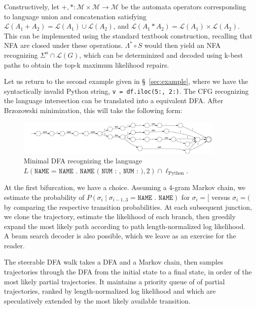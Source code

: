 \documentclass[sigplan,review,acmsmall,nonacm,anonymous]{acmart}\settopmatter{printfolios=false,printccs=false,printacmref=false}
\begin{document}
  Constructively, let $+, *: \mathcal{M}\times \mathcal{M} \rightarrow \mathcal{M}$ be the automata operators corresponding to language union and concatenation satisfying $\mathcal{L}(A_1 + A_2) = \mathcal{L}(A_1)\cup\mathcal{L}(A_2)$, and $\mathcal{L}(A_1 * A_2) = \mathcal{L}(A_1)\times\mathcal{L}(A_2)$. This can be implemented using the standard textbook construction, recalling that NFA are closed under these operations. $\Lambda^* \circ S$ would then yield an NFA recognizing $\Sigma^n\cap\mathcal{L}(G)$, which can be determinized and decoded using k-best paths to obtain the top-k maximum likelihood repairs.

Let us return to the second example given in \S~\ref{sec:example}, where we have the syntactically invalid Python string, \texttt{v = df.iloc(5:, 2:)}. The CFG recognizing the language intersection can be translated into a equivalent DFA. After Brzozowski minimization, this will take the following form:


\begin{figure}[H]
  \centering
  \includegraphics[width=0.9\textwidth]{exampleDFA.pdf}
  \caption{Minimal DFA recognizing the language $L(\texttt{NAME = NAME . NAME ( NUM : , NUM : )}, 2) \cap \ell_\text{Python}$.}
  \label{fig:exampleDFA}
\end{figure}

At the first bifurcation, we have a choice. Assuming a 4-gram Markov chain, we estimate the probability of $P(\sigma_i \mid \sigma_{i-1..3}=\texttt{NAME . NAME})$ for $\sigma_i = \texttt{[}$ versus $\sigma_i = \texttt{(}$ by comparing the respective transition probabilities. At each subsequent junction, we clone the trajectory, estimate the likelihood of each branch, then greedily expand the most likely path according to path length-normalized log likelihood. A beam search decoder is also possible, which we leave as an exercise for the reader.

  The steerable DFA walk takes a DFA and a Markov chain, then samples trajectories through the DFA from the initial state to a final state, in order of the most likely partial trajectories. It maintains a priority queue of of partial trajectories, ranked by length-normalized log likelihood and which are speculatively extended by the most likely available transition.
\end{document}
